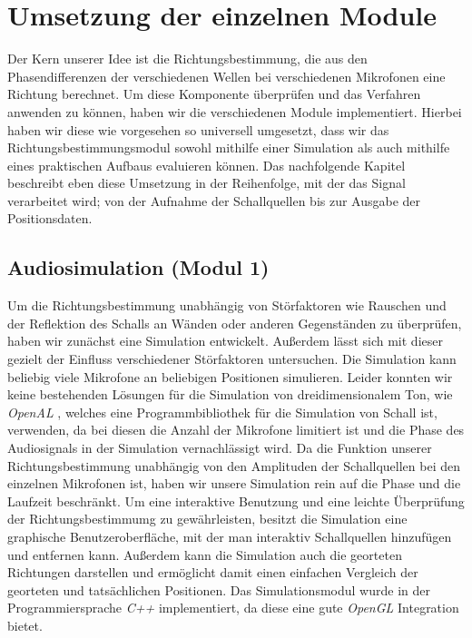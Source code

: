 \section{Umsetzung der einzelnen Module} 
Der Kern unserer Idee ist die Richtungsbestimmung, die aus den Phasendifferenzen der verschiedenen Wellen bei verschiedenen Mikrofonen eine Richtung berechnet. Um diese Komponente überprüfen und das Verfahren anwenden zu können, haben wir die verschiedenen Module implementiert. Hierbei haben wir diese wie vorgesehen so universell umgesetzt, dass wir das Richtungsbestimmungsmodul sowohl mithilfe einer Simulation als auch mithilfe eines praktischen Aufbaus evaluieren können. Das nachfolgende Kapitel beschreibt eben diese Umsetzung in der Reihenfolge, mit der das Signal verarbeitet wird; von der Aufnahme der Schallquellen bis zur Ausgabe der Positionsdaten.

\subsection{Audiosimulation (Modul 1)}
Um die Richtungsbestimmung unabhängig von Störfaktoren wie Rauschen und der Reflektion des Schalls an Wänden oder anderen Gegenständen zu überprüfen, haben wir zunächst eine Simulation entwickelt. Außerdem lässt sich mit dieser gezielt der Einfluss verschiedener Störfaktoren untersuchen. Die Simulation kann beliebig viele Mikrofone an beliebigen Positionen simulieren. Leider konnten wir keine bestehenden Lösungen für die Simulation von dreidimensionalem Ton, wie \textit{OpenAL} \cite{OpenAL}, welches eine Programmbibliothek für die Simulation von Schall ist, verwenden, da bei diesen die Anzahl der Mikrofone limitiert ist und die Phase des Audiosignals in der Simulation vernachlässigt wird. Da die Funktion unserer Richtungsbestimmung unabhängig von den Amplituden der Schallquellen bei den einzelnen Mikrofonen ist, haben wir unsere Simulation rein auf die Phase und die Laufzeit beschränkt. Um eine interaktive Benutzung und eine leichte Überprüfung der Richtungsbestimmumg zu gewährleisten, besitzt die Simulation eine graphische Benutzeroberfläche, mit der man interaktiv Schallquellen hinzufügen und entfernen kann. Außerdem kann die Simulation auch die georteten Richtungen darstellen und ermöglicht damit einen einfachen Vergleich der georteten und tatsächlichen Positionen. Das Simulationsmodul wurde in der Programmiersprache \textit{C++} implementiert, da diese eine gute \textit{OpenGL} Integration bietet.

